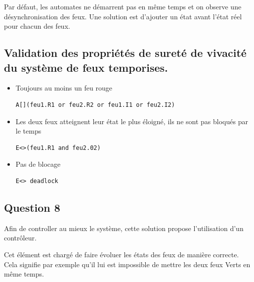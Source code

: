 \documentclass[pdftex,12pt,a4paper]{article}
\begin{document}
Par défaut, les automates ne démarrent pas en même temps et on observe une désynchronisation des feux. Une solution est d'ajouter un état avant l'état réel pour chacun des feux.


\subsection*{Validation des propriétés de sureté de vivacité du système de feux temporises.}

\begin{itemize}
	\item Toujours au moins un feu rouge
\begin{verbatim}
A[](feu1.R1 or feu2.R2 or feu1.I1 or feu2.I2)
\end{verbatim}

	\item Les deux feux atteignent leur état le plus éloigné, ils ne sont pas bloqués par le temps
\begin{verbatim}
E<>(feu1.R1 and feu2.02)
\end{verbatim}

	\item Pas de blocage
\begin{verbatim}
E<> deadlock
\end{verbatim}

\end{itemize}

\subsection{Question 8}

Afin de controller au mieux le système, cette solution propose l'utilisation d'un contrôleur.

Cet élément est chargé de faire évoluer les états des feux de manière correcte. Cela signifie par exemple qu'il lui est impossible de mettre les deux feux Verts en même temps.
\end{document}
